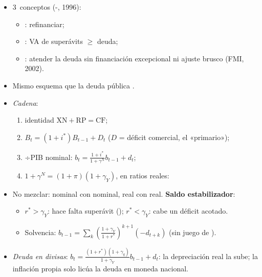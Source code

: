 \documentclass{article}
\begin{document}
\begin{columnas}
\begin{itemize}
\item 3~conceptos (-, 1996):
  \begin{itemize}
  \item {}: refinanciar;
  \item {}: VA de superávits $\geq$ deuda;
  \item {}: atender la deuda sin financiación excepcional ni ajuste brusco (FMI, 2002).
  \end{itemize}
\item Mismo esquema que la deuda pública .
\end{itemize}
\begin{itemize}
\item \emph{Cadena}:
  \begin{enumerate}
  \item identidad $\mathrm{XN}+\mathrm{RP}=\mathrm{CF}$;
  \item $B_t=(1+i^*)B_{t-1}+D_t$ ($D$ = déficit comercial, el «primario»);
  \item ÷PIB nominal: $b_t=\frac{1+i^*}{1+\gamma^N}b_{t-1}+d_t$;
  \item $1+\gamma^N=(1+\pi)(1+\gamma_Y)$, en ratios reales:
  \end{enumerate}
\item No mezclar: nominal con nominal, real con real. \textbf{Saldo estabilizador}:
  \begin{itemize}
  \item $r^*>\gamma_Y$: hace falta superávit (); $r^*<\gamma_Y$: cabe un déficit acotado.
  \item Solvencia: $b_{t-1}=\sum_k\left(\tfrac{1+\gamma_Y}{1+r^*}\right)^{k+1}(-d_{t+k})$ (sin juego de ).
  \end{itemize}
\item \emph{Deuda en divisas}: $b_t=\frac{(1+r^*)(1+\gamma_q)}{1+\gamma_Y}b_{t-1}+d_t$: la depreciación real la sube; la inflación propia solo licúa la deuda en moneda nacional.
\end{itemize}

\end{columnas}
\end{document}

